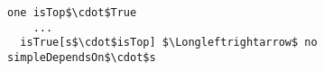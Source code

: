 \lstset{frame=tb, aboveskip=12pt, belowskip=-3pt, breaklines=true, basicstyle=\small\ttfamily, tabsize=2, mathescape=true}
\begin{lstlisting}[caption={facts.als, lines 17-41}, label=alloy:top, captionpos=b]
one isTop$\cdot$True
    ...
  isTrue[s$\cdot$isTop] $\Longleftrightarrow$ no simpleDependsOn$\cdot$s
\end{lstlisting}